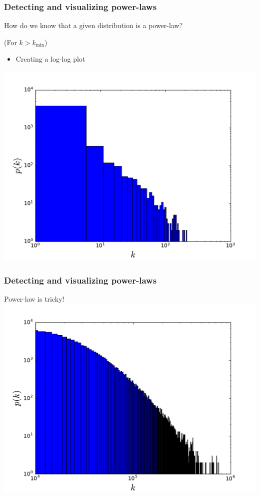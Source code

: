 \documentclass{beamer}
\begin{document}
\begin{frame}
    \frametitle{Detecting and visualizing power-laws}
    \centering
    How do we know that a given distribution is a power-law?
    
    (For $k > k_{\text{min}}$)
    \begin{itemize}
    \setlength\itemsep{1em}
        \item{Creating a log-log plot}
    \end{itemize}
    \includegraphics[width=0.8\columnwidth]{deg_distri_global_airport_log.pdf}
\end{frame}
\begin{frame}
    \frametitle{Detecting and visualizing power-laws}
    \centering
    Power-law is tricky!
    \includegraphics[width=0.8\columnwidth]{lognormal.pdf}
\end{frame}
\end{document}
